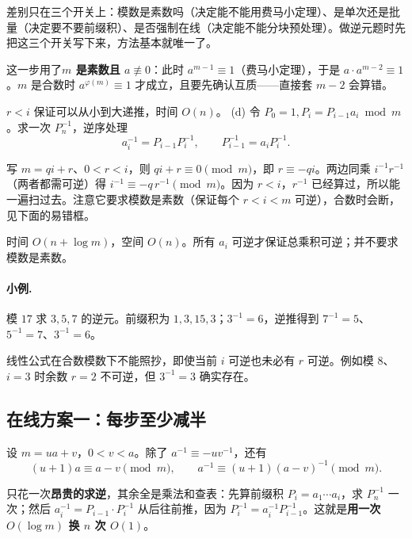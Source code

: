 \documentclass[UTF8,a4paper,11pt,twoside,openright,fontset=fandol]{ctexbook}
\theoremstyle{definition}
\begin{document}
\begin{tip}[为什么要分五类]
差别只在三个开关上：模数是素数吗（决定能不能用费马小定理）、是单次还是批量（决定要不要前缀积）、是否强制在线（决定能不能分块预处理）。做逆元题时先把这三个开关写下来，方法基本就唯一了。
\end{tip}

\begin{tip}
这一步用了\textbf{$m$ 是素数且 $a\not\equiv0$}：此时 $a^{m-1}\equiv1$（费马小定理），于是 $a\cdot a^{m-2}\equiv1$。$m$ 是合数时 $a^{\varphi(m)}\equiv1$ 才成立，且要先确认互质——直接套 $m-2$ 会算错。
\end{tip}

$r<i$ 保证可以从小到大递推，时间 $O(n)$。
(d) 令 $P_0=1,P_i=P_{i-1}a_i\bmod m$。求一次 $P_n^{-1}$，逆序处理
\[
 a_i^{-1}=P_{i-1}P_i^{-1},\qquad P_{i-1}^{-1}=a_iP_i^{-1}.
\]

\begin{tip}[线性递推逆元公式是怎么来的]
写 $m=qi+r$、$0<r<i$，则 $qi+r\equiv0\pmod m$，即 $r\equiv-qi$。两边同乘 $i^{-1}r^{-1}$（两者都需可逆）得 $i^{-1}\equiv-q\,r^{-1}\pmod m$。因为 $r<i$，$r^{-1}$ 已经算过，所以能一遍扫过去。注意它要求模数是素数（保证每个 $r<i<m$ 可逆），合数时会断，见下面的易错框。
\end{tip}

时间 $O(n+\log m)$，空间 $O(n)$。所有 $a_i$ 可逆才保证总乘积可逆；并不要求模数是素数。

\paragraph{小例.} 模 $17$ 求 $3,5,7$ 的逆元。前缀积为 $1,3,15,3$；$3^{-1}=6$，逆推得到 $7^{-1}=5$、$5^{-1}=7$、$3^{-1}=6$。

\begin{pitfall}
线性公式在合数模数下不能照抄，即使当前 $i$ 可逆也未必有 $r$ 可逆。例如模 $8$、$i=3$ 时余数 $r=2$ 不可逆，但 $3^{-1}=3$ 确实存在。
\end{pitfall}

\subsection{在线方案一：每步至少减半}
设 $m=ua+v$，$0<v<a$。除了 $a^{-1}\equiv-u v^{-1}$，还有
\[
 (u+1)a\equiv a-v\pmod m,
 \qquad a^{-1}\equiv(u+1)(a-v)^{-1}\pmod m.
\]

\begin{tip}[前缀积批量求逆元的想法]
只花一次\textbf{昂贵的求逆}，其余全是乘法和查表：先算前缀积 $P_i=a_1\cdots a_i$，求 $P_n^{-1}$ 一次；然后 $a_i^{-1}=P_{i-1}\cdot P_i^{-1}$ 从后往前推，因为 $P_i^{-1}=a_i^{-1}P_{i-1}^{-1}$。这就是\textbf{用一次 $O(\log m)$ 换 $n$ 次 $O(1)$}。
\end{tip}
\end{document}
